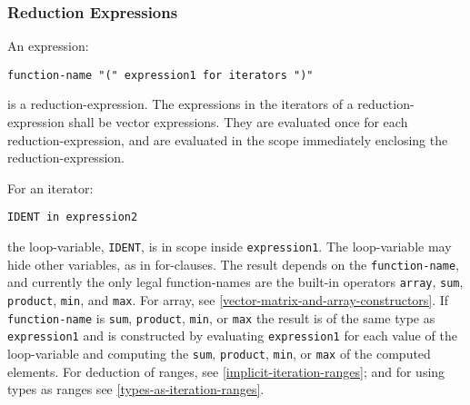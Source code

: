 \subsubsection{Reduction Expressions}

An expression:
\begin{lstlisting}[language=grammar]
function-name "(" expression1 for iterators ")"
\end{lstlisting}

is a reduction-expression. The expressions in the iterators of a
reduction-expression shall be vector expressions. They are evaluated
once for each reduction-expression, and are evaluated in the scope
immediately enclosing the reduction-expression.

For an iterator:
\begin{lstlisting}[language=grammar]
IDENT in expression2
\end{lstlisting}

the loop-variable, \lstinline!IDENT!, is in scope inside \lstinline!expression1!. The
loop-variable may hide other variables, as in for-clauses. The result
depends on the \lstinline!function-name!, and currently the only legal
function-names are the built-in operators \lstinline!array!, \lstinline!sum!,
\lstinline!product!, \lstinline!min!, and
\lstinline!max!. For array, see \autoref{vector-matrix-and-array-constructors}. If \lstinline!function-name! is
\lstinline!sum!, \lstinline!product!, \lstinline!min!,
or \lstinline!max! the result is of the same type as \lstinline!expression1! and is constructed
by evaluating \lstinline!expression1! for each value of the loop-variable and
computing the \lstinline!sum!, \lstinline!product!, \lstinline!min!, or
\lstinline!max! of the computed elements. For
deduction of ranges, see \autoref{implicit-iteration-ranges}; and for using types as ranges
see \autoref{types-as-iteration-ranges}.

